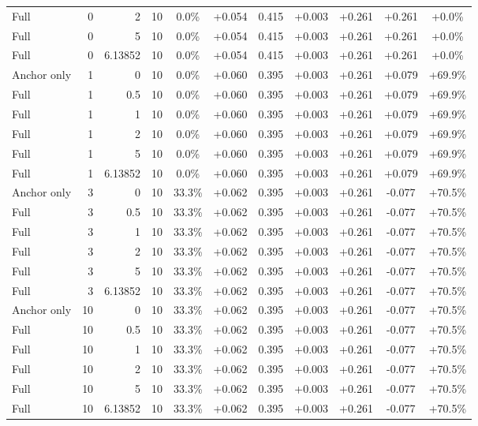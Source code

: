 \begin{table}[htbp]
\begin{tabular}{lrrrccccccc}
Full & 0 & 2 & 10 & 0.0\% & +0.054 & 0.415 & +0.003 & +0.261 & +0.261 & +0.0\% \\
Full & 0 & 5 & 10 & 0.0\% & +0.054 & 0.415 & +0.003 & +0.261 & +0.261 & +0.0\% \\
Full & 0 & 6.13852 & 10 & 0.0\% & +0.054 & 0.415 & +0.003 & +0.261 & +0.261 & +0.0\% \\
Anchor only & 1 & 0 & 10 & 0.0\% & +0.060 & 0.395 & +0.003 & +0.261 & +0.079 & +69.9\% \\
Full & 1 & 0.5 & 10 & 0.0\% & +0.060 & 0.395 & +0.003 & +0.261 & +0.079 & +69.9\% \\
Full & 1 & 1 & 10 & 0.0\% & +0.060 & 0.395 & +0.003 & +0.261 & +0.079 & +69.9\% \\
Full & 1 & 2 & 10 & 0.0\% & +0.060 & 0.395 & +0.003 & +0.261 & +0.079 & +69.9\% \\
Full & 1 & 5 & 10 & 0.0\% & +0.060 & 0.395 & +0.003 & +0.261 & +0.079 & +69.9\% \\
Full & 1 & 6.13852 & 10 & 0.0\% & +0.060 & 0.395 & +0.003 & +0.261 & +0.079 & +69.9\% \\
Anchor only & 3 & 0 & 10 & 33.3\% & +0.062 & 0.395 & +0.003 & +0.261 & -0.077 & +70.5\% \\
Full & 3 & 0.5 & 10 & 33.3\% & +0.062 & 0.395 & +0.003 & +0.261 & -0.077 & +70.5\% \\
Full & 3 & 1 & 10 & 33.3\% & +0.062 & 0.395 & +0.003 & +0.261 & -0.077 & +70.5\% \\
Full & 3 & 2 & 10 & 33.3\% & +0.062 & 0.395 & +0.003 & +0.261 & -0.077 & +70.5\% \\
Full & 3 & 5 & 10 & 33.3\% & +0.062 & 0.395 & +0.003 & +0.261 & -0.077 & +70.5\% \\
Full & 3 & 6.13852 & 10 & 33.3\% & +0.062 & 0.395 & +0.003 & +0.261 & -0.077 & +70.5\% \\
Anchor only & 10 & 0 & 10 & 33.3\% & +0.062 & 0.395 & +0.003 & +0.261 & -0.077 & +70.5\% \\
Full & 10 & 0.5 & 10 & 33.3\% & +0.062 & 0.395 & +0.003 & +0.261 & -0.077 & +70.5\% \\
Full & 10 & 1 & 10 & 33.3\% & +0.062 & 0.395 & +0.003 & +0.261 & -0.077 & +70.5\% \\
Full & 10 & 2 & 10 & 33.3\% & +0.062 & 0.395 & +0.003 & +0.261 & -0.077 & +70.5\% \\
Full & 10 & 5 & 10 & 33.3\% & +0.062 & 0.395 & +0.003 & +0.261 & -0.077 & +70.5\% \\
Full & 10 & 6.13852 & 10 & 33.3\% & +0.062 & 0.395 & +0.003 & +0.261 & -0.077 & +70.5\% \\

\end{tabular}
\end{table}
